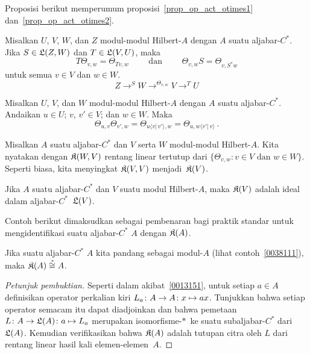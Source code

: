 Proposisi berikut memperumum proposisi~\ref{prop_op_act_otimes1} dan~\ref{prop_op_act_otimes2}.

\begin{prop} Misalkan $U$, $V$, $W$, dan $Z$ modul-modul Hilbert-$A$ dengan $A$ suatu aljabar-$C^*$.
Jika $S \in \mathfrak{L}(Z,W)$ dan $T \in \mathfrak{L}(V,U)$, maka
  \[ T \Theta_{v,w} = \Theta_{Tv,w} \qquad \text{ dan } \qquad
                               \Theta_{v,w} S = \Theta_{v,S^*w} \]
untuk semua $v \in V$ dan $w \in W$.
  \[ Z \to^S W \to^{\Theta_{v,w}} V \to^T U \]
\end{prop}

\begin{prop} Misalkan $U$, $V$, dan $W$ modul-modul Hilbert-$A$ dengan $A$ suatu aljabar-$C^*$.
Andaikan $u \in U$; $v$, $v' \in V$; dan $w \in W$. Maka
  \[ \Theta_{u,v}\Theta_{v',w} = \Theta_{u\langle v \vert\,v' \rangle, w}
                               = \Theta_{u, w\langle v'\vert\,v \rangle}\,. \]
\end{prop}

\begin{notn}\label{0038331} Misalkan $A$ suatu aljabar-$C^*$ dan $V$ serta $W$
modul-modul Hilbert-$A$. Kita nyatakan dengan
$\mathfrak{K}(W,V)$ rentang linear tertutup dari $\{\Theta_{v,w}\colon v \in V \text{ dan } w \in
W\}$. Seperti biasa, kita menyingkat $\mathfrak{K}(V,V)$ menjadi~$\mathfrak{K}(V)$.
\end{notn}

\begin{prop}\label{0038334} Jika $A$ suatu aljabar-$C^*$ dan $V$
suatu modul Hilbert-$A$, maka $\mathfrak{K}(V)$ adalah ideal dalam aljabar-$C^*$~$\mathfrak{L}(V)$.
\end{prop}

Contoh berikut dimaksudkan sebagai pembenaran bagi praktik standar untuk mengidentifikasi suatu
aljabar-$C^*$ $A$ dengan $\mathfrak{K}(A)$.

\begin{exam}\label{0038337} Jika suatu aljabar-$C^*$ $A$ kita pandang sebagai modul-$A$ (lihat
contoh~\ref{0038111}), maka $\mathfrak{K}(A)\overset{\,{}_\ast}{\cong}A$.
\end{exam}

\begin{proof}[\emph{Petunjuk pembuktian}] Seperti dalam akibat~\ref{0013151}, untuk setiap
$a \in A$ definisikan operator perkalian kiri $L_a\colon A \rightarrow A\colon x \mapsto ax$. Tunjukkan
bahwa setiap operator semacam itu dapat diadjoinkan dan bahwa pemetaan $L\colon A \rightarrow \mathfrak{L}(A) \colon
a \mapsto L_a$ merupakan isomorfisme-$*\,$ ke suatu subaljabar-$C^*$ dari~$\mathfrak{L}(A)$. Kemudian
verifikasikan bahwa $\mathfrak{K}(A)$ adalah tutupan citra oleh $L$ dari rentang linear hasil kali
elemen-elemen~$A$. \ns
\end{proof}

